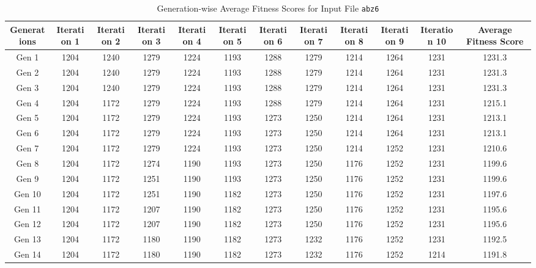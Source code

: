 \documentclass[12pt]{article}
\begin{document}
\begin{table}[h]
    \centering
    \caption{Generation-wise Average Fitness Scores for Input File \texttt{abz6}}
    \label{tab:average_fitness_scores_abz6}
    \begin{adjustbox}{max width=1\textwidth} %
        \begin{tabular}{*{12}{c}}
            \toprule
            Generations & Iteration 1 & Iteration 2 & Iteration 3 & Iteration 4 & Iteration 5 & Iteration 6 & Iteration 7 & Iteration 8 & Iteration 9 & Iteration 10 & Average Fitness Score \\
            \midrule
            Gen 1 & 1204 & 1240 & 1279 & 1224 & 1193 & 1288 & 1279 & 1214 & 1264 & 1231 & 1231.3 \\
            Gen 2 & 1204 & 1240 & 1279 & 1224 & 1193 & 1288 & 1279 & 1214 & 1264 & 1231 & 1231.3 \\
            Gen 3 & 1204 & 1240 & 1279 & 1224 & 1193 & 1288 & 1279 & 1214 & 1264 & 1231 & 1231.3 \\
            Gen 4 & 1204 & 1172 & 1279 & 1224 & 1193 & 1288 & 1279 & 1214 & 1264 & 1231 & 1215.1 \\
            Gen 5 & 1204 & 1172 & 1279 & 1224 & 1193 & 1273 & 1250 & 1214 & 1264 & 1231 & 1213.1 \\
            Gen 6 & 1204 & 1172 & 1279 & 1224 & 1193 & 1273 & 1250 & 1214 & 1264 & 1231 & 1213.1 \\
            Gen 7 & 1204 & 1172 & 1279 & 1224 & 1193 & 1273 & 1250 & 1214 & 1252 & 1231 & 1210.6 \\
            Gen 8 & 1204 & 1172 & 1274 & 1190 & 1193 & 1273 & 1250 & 1176 & 1252 & 1231 & 1199.6 \\
            Gen 9 & 1204 & 1172 & 1251 & 1190 & 1193 & 1273 & 1250 & 1176 & 1252 & 1231 & 1199.6 \\
            Gen 10 & 1204 & 1172 & 1251 & 1190 & 1182 & 1273 & 1250 & 1176 & 1252 & 1231 & 1197.6 \\
            Gen 11 & 1204 & 1172 & 1207 & 1190 & 1182 & 1273 & 1250 & 1176 & 1252 & 1231 & 1195.6 \\
            Gen 12 & 1204 & 1172 & 1207 & 1190 & 1182 & 1273 & 1250 & 1176 & 1252 & 1231 & 1195.6 \\
            Gen 13 & 1204 & 1172 & 1180 & 1190 & 1182 & 1273 & 1232 & 1176 & 1252 & 1231 & 1192.5 \\
            Gen 14 & 1204 & 1172 & 1180 & 1190 & 1182 & 1273 & 1232 & 1176 & 1252 & 1214 & 1191.8 \\

\end{tabular}
\end{adjustbox}
\end{table}
\end{document}
